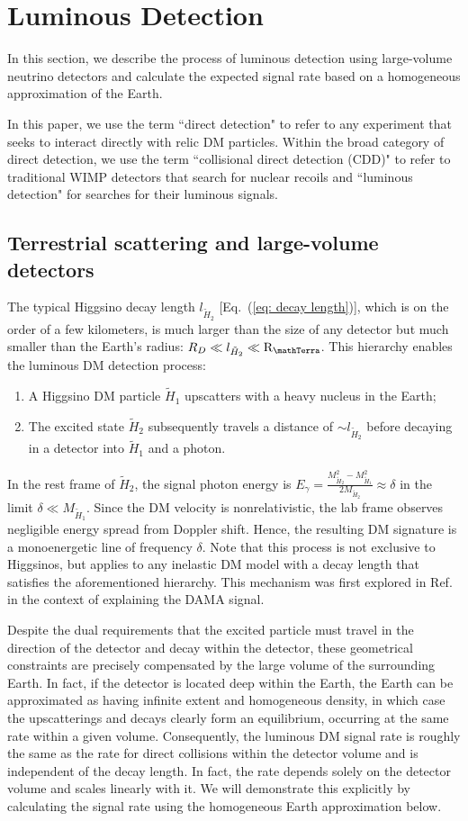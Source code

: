 \documentclass[aps,prd,amsmath,amssymb,10pt,letterpaper,balancelastpage,showpacs,superscriptaddress,nofootinbib,floatfix,notitlepage,longbibliography,twocolumn
]{revtex4-2}
\newcommand{\Eq}[1]{Eq.~(#1)}
\newcommand{\REarth}{\mathrm{R}_{\mathTerra}}
\newcommand{\Hone}{\tilde{H}_1}
\newcommand{\Htwo}{\tilde{H}_2}
\newcommand{\lH}{l_{\tilde{H}_2}}
\begin{document}
\section{Luminous Detection}
In this section, we describe the process of luminous detection using large-volume neutrino detectors and calculate the expected signal rate based on a homogeneous approximation of the Earth.

In this paper, we use the term ``direct detection" to refer to any experiment that seeks to interact directly with relic DM particles.
Within the broad category of direct detection, we use the term ``collisional direct detection (CDD)" to refer to traditional WIMP detectors that search for nuclear recoils and ``luminous detection" for searches for their luminous signals.

\subsection{Terrestrial scattering and large-volume detectors}
The typical Higgsino decay length $\lH$ [\Eq{\ref{eq: decay length}}], which is on the order of a few kilometers, is much larger than the size of any detector but much smaller than the Earth's radius: $R_D \ll \lH \ll \REarth$. This hierarchy enables the luminous DM detection process:
\begin{enumerate}
    \item A Higgsino DM particle $\tilde{H}_1$ upscatters with a heavy nucleus in the Earth;
    \item The excited state $\Htwo$ subsequently travels a distance of $\sim \lH$ before decaying in a detector into $\Hone$ and a photon.
\end{enumerate}
In the rest frame of $\Htwo$, the signal photon energy is $E_{\gamma} = \frac{M_{\Htwo}^2 - M_{\Hone}^2}{2M_{\Htwo}} \approx \delta$ in the limit $\delta \ll M_{\Hone}$. Since the DM velocity is nonrelativistic, the lab frame observes negligible energy spread from Doppler shift. Hence, the resulting DM signature is a monoenergetic line of frequency $\delta$. Note that this process is not exclusive to Higgsinos, but applies to any inelastic DM model with a decay length that satisfies the aforementioned hierarchy. This mechanism was first explored in Ref.~\cite{LuminousDM} in the context of explaining the DAMA signal.

Despite the dual requirements that the excited particle must travel in the direction of the detector and decay within the detector, these geometrical constraints are precisely compensated by the large volume of the surrounding Earth. In fact, if the detector is located deep within the Earth, the Earth can be approximated as having infinite extent and homogeneous density, in which case the upscatterings and decays clearly form an equilibrium, occurring at the same rate within a given volume. Consequently, the luminous DM signal rate is roughly the same as the rate for direct collisions within the detector volume and is independent of the decay length. In fact, the rate depends solely on the detector volume and scales linearly with it. We will demonstrate this explicitly by calculating the signal rate using the homogeneous Earth approximation below.
\end{document}
